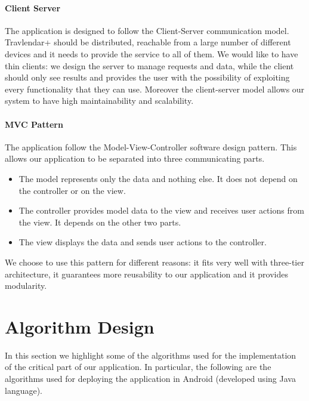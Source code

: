 \documentclass[12pt,titlepage]{article}
\begin{document}
\paragraph{Client Server}
The application is designed to follow the Client-Server communication model. Travlendar+ should be distributed, reachable from a large number of different devices and it needs to provide the service to all of them.
We would like to have thin clients: we design the server to manage requests and data, while the client should only see results and provides the user with the possibility of exploiting every functionality that they can use.
Moreover the client-server model allows our system to have high maintainability and scalability.


\paragraph{MVC Pattern} The application follow the Model-View-Controller software design pattern. This allows our application to be separated into three communicating parts.
\begin{itemize}
\item The model represents only the data and nothing else. It does not depend on the controller or on the view.
\item The controller provides model data to the view and receives user actions from the view. It depends on the other two parts.
\item The view displays the data and sends user actions to the controller.
\end{itemize}
We choose to use this pattern for different reasons: it fits very well with three-tier architecture, it guarantees more reusability to our application and it provides modularity.

\section{Algorithm Design}
In this section we highlight some of the algorithms used for the implementation of the critical part of our application. In particular, the following are the algorithms used for deploying the application in Android (developed using Java language). 
\end{document}
